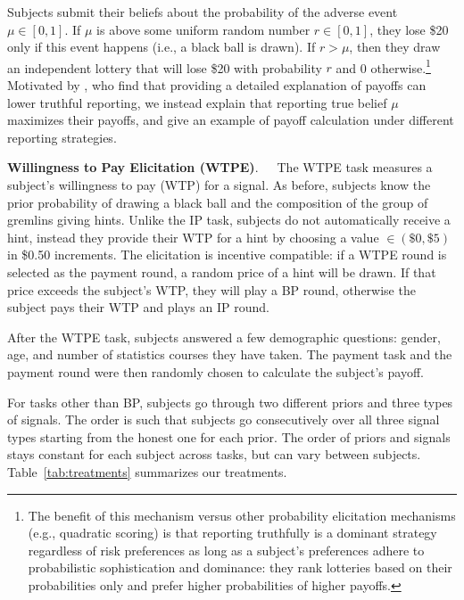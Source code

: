 \documentclass[12pt,a4paper]{article}
\begin{document}
Subjects submit their beliefs about the probability of the adverse event $\mu \in [0,1]$. If $\mu$ is above some uniform random number $r\in[0,1]$, they lose \$20 only if this event happens (i.e., a black ball is drawn). If $r > \mu$, then they draw an independent lottery that will lose \$20 with probability $r$ and 0 otherwise.\footnote{The benefit of this mechanism versus other probability elicitation mechanisms (e.g., quadratic scoring) is that reporting truthfully is a dominant strategy regardless of risk preferences \citep{karni_mechanism_2009-1} as long as a subject's preferences adhere to probabilistic sophistication and dominance: they rank lotteries based on their probabilities only and prefer higher probabilities of higher payoffs.} Motivated by \citet{danz_belief_2020}, who find that providing a detailed explanation of payoffs can lower truthful reporting, we instead explain that reporting true belief $\mu$ maximizes their payoffs, and give an example of payoff calculation under different reporting strategies.

\bigskip
\noindent\textbf{Willingness to Pay Elicitation (WTPE)}.\ \ \ The WTPE task measures a subject's willingness to pay (WTP) for a signal. As before, subjects know the prior probability of drawing a black ball and the composition of the group of gremlins giving hints.  Unlike the IP task, subjects do not automatically receive a hint, instead they provide their WTP for a hint by choosing a value $\in (\$0,\$5)$ in \$0.50 increments. The elicitation is incentive compatible: if a WTPE round is selected as the payment round, a random price of a hint will be drawn. If that price exceeds the subject's WTP, they will play a BP round, otherwise the subject pays their WTP and plays an IP round.  

\vspace{10pt} 

After the WTPE task, subjects answered a few demographic questions: gender, age, and number of statistics courses they have taken. The payment task and the payment round were then randomly chosen to calculate the subject's payoff. 

For tasks other than BP, subjects go through two different priors and three types of signals. The order is such that subjects go consecutively over all three signal types starting from the honest one for each prior. The order of priors and signals stays constant for each subject across tasks, but can vary between subjects. Table~\ref{tab:treatments} summarizes our treatments.
\end{document}
